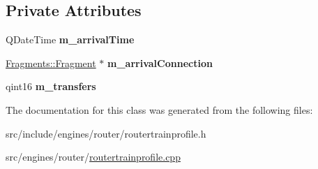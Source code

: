 \subsection*{Private Attributes}
\begin{DoxyCompactItemize}
\item 
\mbox{\label{classRouterEngine_1_1TrainProfile_a5098409febd73d98a3d2093cbef8ca14}} 
Q\+Date\+Time {\bfseries m\+\_\+arrival\+Time}
\item 
\mbox{\label{classRouterEngine_1_1TrainProfile_a0e06b9aee6702dcdd4005ed46a3a342f}} 
\mbox{\hyperlink{classFragments_1_1Fragment}{Fragments\+::\+Fragment}} $\ast$ {\bfseries m\+\_\+arrival\+Connection}
\item 
\mbox{\label{classRouterEngine_1_1TrainProfile_a59168106ca14045e79395be000c4012a}} 
qint16 {\bfseries m\+\_\+transfers}
\end{DoxyCompactItemize}


The documentation for this class was generated from the following files\+:\begin{DoxyCompactItemize}
\item 
src/include/engines/router/routertrainprofile.\+h\item 
src/engines/router/\mbox{\hyperlink{routertrainprofile_8cpp}{routertrainprofile.\+cpp}}\end{DoxyCompactItemize}
